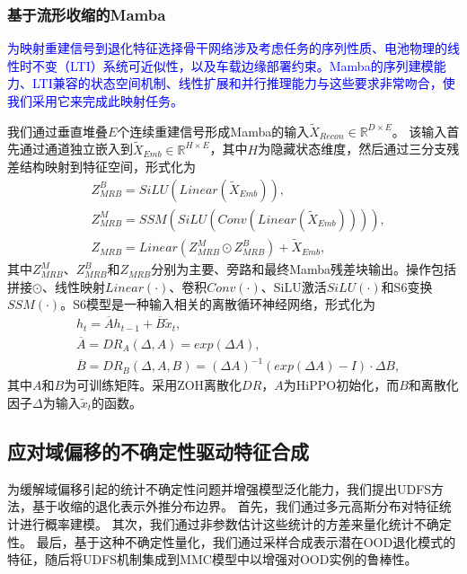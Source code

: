 \documentclass[UTF8,lettersize,journal]{IEEEtran}
\newcommand{\rev}[1]{\textcolor{blue}{#1}}
\begin{document}
\subsubsection{基于流形收缩的Mamba}

\rev{为映射重建信号到退化特征选择骨干网络涉及考虑任务的序列性质、电池物理的线性时不变（LTI）系统可近似性，以及车载边缘部署约束。Mamba的序列建模能力、LTI兼容的状态空间机制、线性扩展和并行推理能力\cite{gu2024mamba}与这些要求非常吻合，使我们采用它来完成此映射任务。}

我们通过垂直堆叠$E$个连续重建信号形成Mamba的输入$\widetilde{X}_{Recon} \in \mathbb{R}^{D \times E}$。
该输入首先通过通道独立嵌入到$\widetilde{X}_{Emb} \in \mathbb{R}^{H \times E}$，其中$H$为隐藏状态维度，然后通过三分支残差结构映射到特征空间，形式化为
\begin{align}
& Z^{B}_{MRB} = SiLU(Linear(\widetilde{X}_{Emb})), \\
& Z^{M}_{MRB} = SSM(SiLU(Conv(Linear(\widetilde{X}_{Emb})))), \\
& Z_{MRB} = Linear(Z^{M}_{MRB} \odot Z^{B}_{MRB}) + \widetilde{X}_{Emb},
\end{align}
其中$Z^{M}_{MRB}$、$Z^{B}_{MRB}$和$Z_{MRB}$分别为主要、旁路和最终Mamba残差块输出。操作包括拼接$\odot$、线性映射$Linear(\cdot)$、卷积$Conv(\cdot)$、SiLU激活$SiLU(\cdot)$和S6变换$SSM(\cdot)$。S6模型是一种输入相关的离散循环神经网络，形式化为
\begin{align}
& h_{t} = \overline{A}h_{t-1} + \overline{B}\widetilde{x}_{t}, \\
& \overline{A} = DR_{A}(\Delta, A) = exp(\Delta A), \\
& \overline{B} = DR_{B}(\Delta, A, B) = (\Delta A)^{-1}(exp(\Delta A)-I)\cdot\Delta B,
\end{align}
其中$A$和$B$为可训练矩阵。采用ZOH离散化$DR$\cite{gu2024mamba}，$A$为HiPPO初始化\cite{20212610553629}，而$B$和离散化因子$\Delta$为输入$\widetilde{x}_{t}$的函数。

\subsection{应对域偏移的不确定性驱动特征合成}\label{subsec:UDFS}

为缓解域偏移引起的统计不确定性问题并增强模型泛化能力，我们提出UDFS方法，基于收缩的退化表示外推分布边界。
首先，我们通过多元高斯分布对特征统计进行概率建模。
其次，我们通过非参数估计这些统计的方差来量化统计不确定性。
最后，基于这种不确定性量化，我们通过采样合成表示潜在OOD退化模式的特征，随后将UDFS机制集成到MMC模型中以增强对OOD实例的鲁棒性。
\end{document}
